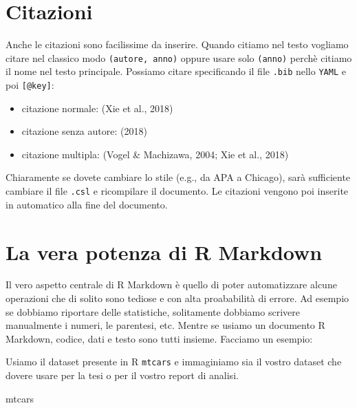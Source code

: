\documentclass[
]{article}
\newenvironment{Shaded}{\begin{snugshade}}{\end{snugshade}}
\newcommand{\NormalTok}[1]{#1}
\providecommand{\tightlist}{%
  \setlength{\itemsep}{0pt}\setlength{\parskip}{0pt}}
\begin{document}
\hypertarget{citazioni}{%
\section{Citazioni}\label{citazioni}}

Anche le citazioni sono facilissime da inserire. Quando citiamo nel testo vogliamo citare nel classico modo \texttt{(autore,\ anno)} oppure usare solo \texttt{(anno)} perchè citiamo il nome nel testo principale. Possiamo citare specificando il file \texttt{.bib} nello \texttt{YAML} e poi \texttt{{[}@key{]}}:

\begin{itemize}
\tightlist
\item
  citazione normale: (Xie et al., 2018)
\item
  citazione senza autore: (2018)
\item
  citazione multipla: (Vogel \& Machizawa, 2004; Xie et al., 2018)
\end{itemize}

Chiaramente se dovete cambiare lo stile (e.g., da APA a Chicago), sarà sufficiente cambiare il file \texttt{.csl} e ricompilare il documento. Le citazioni vengono poi inserite in automatico alla fine del documento.

\hypertarget{la-vera-potenza-di-r-markdown}{%
\section{La vera potenza di R Markdown}\label{la-vera-potenza-di-r-markdown}}

Il vero aspetto centrale di R Markdown è quello di poter automatizzare alcune operazioni che di solito sono tediose e con alta proababilità di errore. Ad esempio se dobbiamo riportare delle statistiche, solitamente dobbiamo scrivere manualmente i numeri, le parentesi, etc. Mentre se usiamo un documento R Markdown, codice, dati e testo sono tutti insieme. Facciamo un esempio:

Usiamo il dataset presente in R \texttt{mtcars} e immaginiamo sia il vostro dataset che dovere usare per la tesi o per il vostro report di analisi.

\begin{Shaded}
\begin{Highlighting}[]
\NormalTok{mtcars}
\end{Highlighting}
\end{Shaded}
\end{document}
